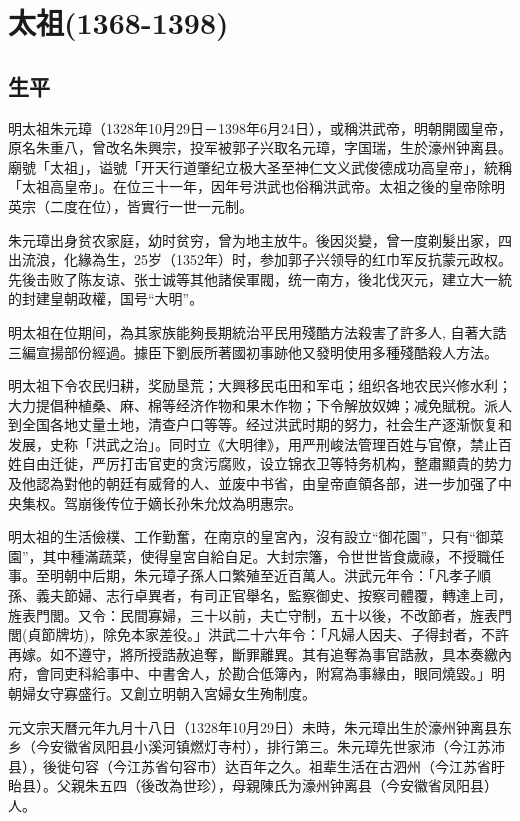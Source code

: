 
\section{太祖\tiny(1368-1398)}

\subsection{生平}

明太祖朱元璋（1328年10月29日－1398年6月24日），或稱洪武帝，明朝開國皇帝，原名朱重八，曾改名朱興宗，投军被郭子兴取名元璋，字国瑞，生於濠州钟离县。廟號「太祖」，谥號「开天行道肇纪立极大圣至神仁文义武俊德成功高皇帝」，統稱「太祖高皇帝」。在位三十一年，因年号洪武也俗稱洪武帝。太祖之後的皇帝除明英宗（二度在位），皆實行一世一元制。

朱元璋出身贫农家庭，幼时贫穷，曾为地主放牛。後因災變，曾一度剃髮出家，四出流浪，化緣為生，25岁（1352年）时，参加郭子兴领导的红巾军反抗蒙元政权。先後击败了陈友谅、张士诚等其他諸侯軍閥，统一南方，後北伐灭元，建立大一統的封建皇朝政權，国号“大明”。

明太祖在位期间，為其家族能夠長期統治平民用殘酷方法殺害了許多人, 自著大誥三編宣揚部份經過。據臣下劉辰所著國初事跡他又發明使用多種殘酷殺人方法。

明太祖下令农民归耕，奖励垦荒；大興移民屯田和军屯；组织各地农民兴修水利；大力提倡种植桑、麻、棉等经济作物和果木作物；下令解放奴婢；减免賦稅。派人到全国各地丈量土地，清查户口等等。经过洪武时期的努力，社会生产逐渐恢复和发展，史称「洪武之治」。同时立《大明律》，用严刑峻法管理百姓与官僚，禁止百姓自由迁徙，严厉打击官吏的贪污腐败，设立锦衣卫等特务机构，整肅顯貴的势力及他認為對他的朝廷有威脅的人、並废中书省，由皇帝直領各部，进一步加强了中央集权。驾崩後传位于嫡长孙朱允炆為明惠宗。

明太祖的生活儉樸、工作勤奮，在南京的皇宮內，沒有設立“御花園”，只有“御菜園”，其中種滿蔬菜，使得皇宮自給自足。大封宗籓，令世世皆食歲祿，不授職任事。至明朝中后期，朱元璋子孫人口繁殖至近百萬人。洪武元年令：「凡孝子順孫、義夫節婦、志行卓異者，有司正官舉名，監察御史、按察司體覆，轉達上司，旌表門閭。又令：民間寡婦，三十以前，夫亡守制，五十以後，不改節者，旌表門閭(貞節牌坊)，除免本家差役。」洪武二十六年令：「凡婦人因夫、子得封者，不許再嫁。如不遵守，將所授誥赦追奪，斷罪離異。其有追奪為事官誥赦，具本奏繳內府，會同吏科給事中、中書舍人，於勘合低簿內，附寫為事緣由，眼同燒毀。」明朝婦女守寡盛行。又創立明朝入宮婦女生殉制度。

元文宗天曆元年九月十八日（1328年10月29日）未時，朱元璋出生於濠州钟离县东乡（今安徽省凤阳县小溪河镇燃灯寺村），排行第三。朱元璋先世家沛（今江苏沛县），後徙句容（今江苏省句容市）达百年之久。祖辈生活在古泗州（今江苏省盱眙县）。父親朱五四（後改為世珍），母親陳氏为濠州钟离县（今安徽省凤阳县）人。

